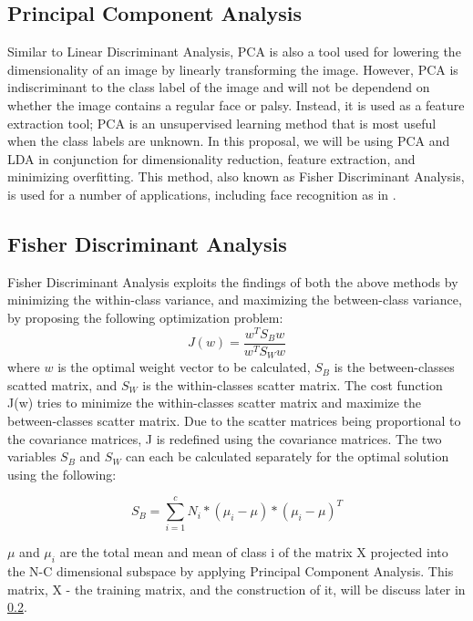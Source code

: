 \documentclass[12pt, conference]{IEEEtran}
\begin{document}
\subsection{Principal Component Analysis} \label{sec:Basics}
Similar to Linear Discriminant Analysis, PCA is also a tool used for lowering the dimensionality of an image by linearly transforming the image. However, PCA is indiscriminant to the class label of the image and will not be dependend on whether the image contains a regular face or palsy. Instead, it is used as a feature extraction tool; PCA is an unsupervised learning method that is most useful when the class labels are unknown. In this proposal, we will be using PCA and LDA in conjunction for dimensionality reduction, feature extraction, and minimizing overfitting. This method, also known as Fisher Discriminant Analysis, is used for a number of applications, including face recognition as in \cite{2}.

\break

\subsection{Fisher Discriminant Analysis} \label{sec:Basics}
Fisher Discriminant Analysis exploits the findings of both the above methods by minimizing the within-class variance, and maximizing the between-class variance, by proposing the following optimization problem:
\begin{equation}\label{equ:fisher}
J(w) = \frac{w^TS_Bw}{w^TS_Ww}
\end{equation}
where $w$ is the optimal weight vector to be calculated, $S_B$ is the between-classes scatted matrix, and $S_W$ is the within-classes scatter matrix. The cost function J(w) tries to minimize the within-classes scatter matrix and maximize the between-classes scatter matrix. Due to the scatter matrices being proportional to the covariance matrices, J is redefined using the covariance matrices. The two variables $S_B$ and $S_W$ can each be calculated separately for the optimal solution using the following:

\begin{equation}
	S_B = \sum_{i=1}^{c} N_i*(\mu_i - \mu)*(\mu_i - \mu)^T	
\end{equation}


$\mu$ and $\mu_i$ are the total mean and mean of class i of the matrix X projected into the N-C dimensional subspace by applying Principal Component Analysis. This matrix, X - the training matrix, and the construction of it, will be discuss later in \ref{sec:Basics}.
\end{document}
